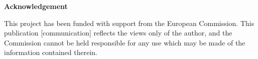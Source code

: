 \thispagestyle{empty}
\begin{Large}
\textbf{Acknowledgement}
\end{Large}
\bigbreak

This project has been funded with support from the European Commission. This publication [communication] reflects the views only of the author, and the Commission cannot be held responsible for any use which may be made of the information contained therein.

\clearpage



